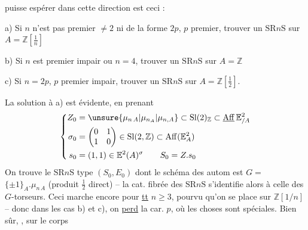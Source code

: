 puisse espérer dans cette direction est ceci :

a) Si $n$  n'est pas premier $\ne 2$ ni de la forme $2p$,
$p$ premier, trouver un $\mathrm{SR}n\mathrm S$ sur $A=\mathbb Z[\frac1n]$

b) Si $n$ est premier impair ou $n=4$,
trouver un $\mathrm{SR}n\mathrm S$ sur $A=\mathbb Z$

c) Si $n=2p$, $p$ premier impair, trouver
un $\mathrm{SR}n\mathrm S$ sur $A=\mathbb Z[\frac12]$.

La solution à a) est évidente, en prenant
\[
\left\{\begin{aligned}
Z_0&=\unsure{\mu_{n\,A}|\mu_{n_A}|\mu_{n,A}}\subset\mathrm{Sl}(2)_{\mathbb Z}\subset\underline{\mathrm{Aff}}\,\mathbb E^2_{/A}\\
\sigma_0&=\begin{pmatrix}0&1\\1&0\end{pmatrix}\in\mathrm{Sl}(2,\mathbb Z)\subset\mathrm{Aff}(\mathbb E_A^2)\\
s_0&=(1,1)\in\mathbb E^2(A)^\sigma\qquad S_0=Z.s_0
\end{aligned}\right.
\]
On trouve le  $\mathrm{SR}n\mathrm S$ type $(S_0,E_0)$
dont le schéma des autom est $G=$
$\{\pm1\}_A.\mu_{n\,A}$ (produit $\frac12$ direct) -- la
cat. fibrée des $\mathrm{SR}n\mathrm S$ s'identifie alors
à celle des $G$-torseurs. Ceci
marche encore pour \uline{tt} $n\geq3$, pourvu
qu'on se place sur $\mathbb Z[1/n]$ --
donc dans les cas b) et c), on \uline{perd}
la car. $p$, où les choses sont spéciales.
Bien sûr,  , sur le corps
